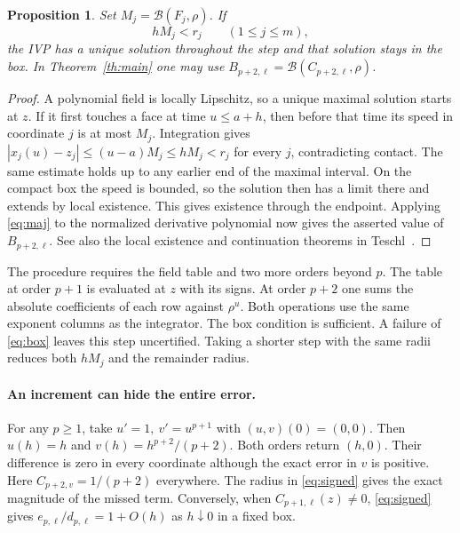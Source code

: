 \documentclass[11pt,letterpaper]{article}
\newcommand{\abs}[1]{\left|#1\right|}
\newtheorem{proposition}[theorem]{Proposition}
\begin{document}
\begin{proposition}\label{prop:box}
Set \(M_j=\mathcal B(F_j,\rho)\). If
\begin{equation}\label{eq:box}
                  h M_j < r_j\qquad (1\le j\le m),
\end{equation}
the IVP has a unique solution throughout the step and that solution stays
in the box. In Theorem~\ref{th:main} one may use
\(B_{p+2,\ell}=\mathcal B(C_{p+2,\ell},\rho)\).
\end{proposition}
\begin{proof}
A polynomial field is locally Lipschitz, so a unique maximal solution starts
at \(z\). If it first touches a face at time \(u\le a+h\), then before
that time its speed in coordinate \(j\) is at most \(M_j\).
Integration gives \(\abs{x_j(u)-z_j}\le(u-a)M_j\le hM_j<r_j\)
for every \(j\), contradicting contact. The same estimate holds up to any
earlier end of the maximal interval. On the compact box the speed is
bounded, so the solution then has a limit there and extends by local
existence. This gives existence through the endpoint. Applying \eqref{eq:maj}
to the normalized derivative polynomial now gives the asserted value of
\(B_{p+2,\ell}\). See also the local existence and continuation theorems
in Teschl~\cite{teschl}.
\end{proof}

The procedure requires the field table and two more orders beyond \(p\).
The table at order \(p+1\) is evaluated at \(z\) with its signs. At order
\(p+2\) one sums the absolute coefficients of each row against \(\rho^u\).
Both operations use the same exponent columns as the integrator.
The box condition is sufficient. A failure of \eqref{eq:box} leaves this
step uncertified. Taking a shorter step with the same radii reduces both
\(hM_j\) and the remainder radius.

\paragraph{An increment can hide the entire error.}
For any \(p\ge1\), take \(u'=1,\ v'=u^{p+1}\) with \((u,v)(0)=(0,0)\).
Then \(u(h)=h\) and \(v(h)=h^{p+2}/(p+2)\). Both orders return \((h,0)\).
Their difference is zero in every coordinate although the exact error in
\(v\) is positive. Here \(C_{p+2,v}=1/(p+2)\) everywhere. The radius in
\eqref{eq:signed} gives the exact magnitude of the missed term. Conversely,
when \(C_{p+1,\ell}(z)\ne0\), \eqref{eq:signed} gives
\(e_{p,\ell}/d_{p,\ell}=1+O(h)\) as \(h\downarrow0\) in a fixed box.
\end{document}
